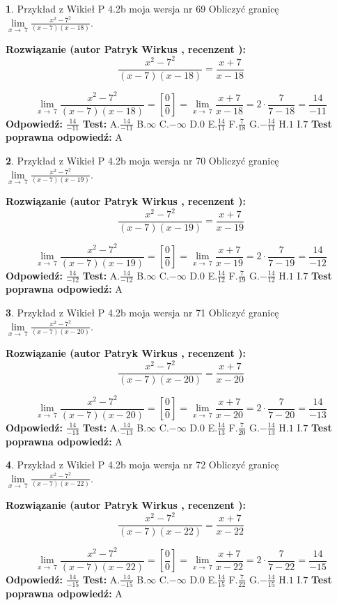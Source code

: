 \documentclass[12pt, a4paper]{article}
\theoremstyle{definition} %
\newtheorem{zad}{}
\newcommand{\zadStart}[1]{\begin{zad}#1\newline}
\newcommand{\zadStop}{\end{zad}}
\newcommand{\rozwStart}[2]{\noindent \textbf{Rozwiązanie (autor #1 , recenzent #2): }\newline}
\newcommand{\rozwStop}{\newline}
\newcommand{\odpStart}{\noindent \textbf{Odpowiedź:}\newline}
\newcommand{\odpStop}{\newline}
\newcommand{\testStart}{\noindent \textbf{Test:}\newline}
\newcommand{\testStop}{\newline}
\newcommand{\kluczStart}{\noindent \textbf{Test poprawna odpowiedź:}\newline}
\newcommand{\kluczStop}{\newline}
\begin{document}
\zadStart{Przykład z Wikieł P 4.2b moja wersja nr 69}
Obliczyć granicę $\lim\limits_{x\to\ 7}\frac{x^{2}-7^{2}}{(x-7)(x-18)}$.
\zadStop
\rozwStart{Patryk Wirkus}{}
$$\frac{x^{2}-7^{2}}{(x-7)(x-18)}=\frac{x+7}{x-18}$$

$$\lim\limits_{x\to\ 7}\frac{x^{2}-7^{2}}{(x-7)(x-18)}=[\frac{0}{0}]=\lim\limits_{x\to\ 7}\frac{x+7}{x-18}=2 \cdot \frac{7}{7-18} = \frac{14}{-11}$$
\rozwStop
\odpStart
$\frac{14}{-11}$
\odpStop
\testStart
A.$\frac{14}{-11}$
B.$\infty$
C.$-\infty$
D.$0$
E.$\frac{14}{11}$
F.$\frac{7}{18}$
G.$-\frac{14}{11}$
H.$1$
I.$7$
\testStop
\kluczStart
A
\kluczStop



\zadStart{Przykład z Wikieł P 4.2b moja wersja nr 70}
Obliczyć granicę $\lim\limits_{x\to\ 7}\frac{x^{2}-7^{2}}{(x-7)(x-19)}$.
\zadStop
\rozwStart{Patryk Wirkus}{}
$$\frac{x^{2}-7^{2}}{(x-7)(x-19)}=\frac{x+7}{x-19}$$

$$\lim\limits_{x\to\ 7}\frac{x^{2}-7^{2}}{(x-7)(x-19)}=[\frac{0}{0}]=\lim\limits_{x\to\ 7}\frac{x+7}{x-19}=2 \cdot \frac{7}{7-19} = \frac{14}{-12}$$
\rozwStop
\odpStart
$\frac{14}{-12}$
\odpStop
\testStart
A.$\frac{14}{-12}$
B.$\infty$
C.$-\infty$
D.$0$
E.$\frac{14}{12}$
F.$\frac{7}{19}$
G.$-\frac{14}{12}$
H.$1$
I.$7$
\testStop
\kluczStart
A
\kluczStop



\zadStart{Przykład z Wikieł P 4.2b moja wersja nr 71}
Obliczyć granicę $\lim\limits_{x\to\ 7}\frac{x^{2}-7^{2}}{(x-7)(x-20)}$.
\zadStop
\rozwStart{Patryk Wirkus}{}
$$\frac{x^{2}-7^{2}}{(x-7)(x-20)}=\frac{x+7}{x-20}$$

$$\lim\limits_{x\to\ 7}\frac{x^{2}-7^{2}}{(x-7)(x-20)}=[\frac{0}{0}]=\lim\limits_{x\to\ 7}\frac{x+7}{x-20}=2 \cdot \frac{7}{7-20} = \frac{14}{-13}$$
\rozwStop
\odpStart
$\frac{14}{-13}$
\odpStop
\testStart
A.$\frac{14}{-13}$
B.$\infty$
C.$-\infty$
D.$0$
E.$\frac{14}{13}$
F.$\frac{7}{20}$
G.$-\frac{14}{13}$
H.$1$
I.$7$
\testStop
\kluczStart
A
\kluczStop



\zadStart{Przykład z Wikieł P 4.2b moja wersja nr 72}
Obliczyć granicę $\lim\limits_{x\to\ 7}\frac{x^{2}-7^{2}}{(x-7)(x-22)}$.
\zadStop
\rozwStart{Patryk Wirkus}{}
$$\frac{x^{2}-7^{2}}{(x-7)(x-22)}=\frac{x+7}{x-22}$$

$$\lim\limits_{x\to\ 7}\frac{x^{2}-7^{2}}{(x-7)(x-22)}=[\frac{0}{0}]=\lim\limits_{x\to\ 7}\frac{x+7}{x-22}=2 \cdot \frac{7}{7-22} = \frac{14}{-15}$$
\rozwStop
\odpStart
$\frac{14}{-15}$
\odpStop
\testStart
A.$\frac{14}{-15}$
B.$\infty$
C.$-\infty$
D.$0$
E.$\frac{14}{15}$
F.$\frac{7}{22}$
G.$-\frac{14}{15}$
H.$1$
I.$7$
\testStop
\kluczStart
A
\kluczStop
\end{document}
